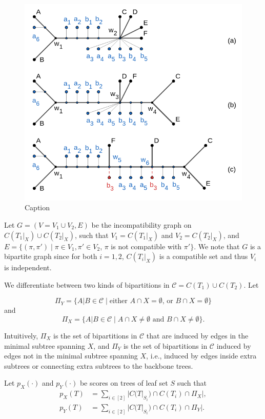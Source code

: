 \documentclass[twocolumn]{bmcart}%
\theoremstyle{mystyle}
\theoremstyle{proofstyle}
\begin{document}
\begin{figure}
    \centering
    \includegraphics[scale = 0.75]{refinement_procedure.png}
    \caption{Caption}
    \label{fig:my_label}
\end{figure}

Let $G = (V=V_1 \cup V_2, E)$ be the incompatibility graph on $C(T_1|_X) \cup C(T_2|_X)$, such that $V_1 = C(T_1|_X)$ and $V_2 = C(T_2|_X)$, and $E = \{(\pi, \pi') \mid \pi \in V_1, \pi' \in V_2$, $\pi$ is not compatible with $\pi'\}$. We note that $G$ is a bipartite graph since for both $i=1,2$, $C(T_i|_X)$ is a compatible set and thus $V_i$ is independent. 

We differentiate between two kinds of bipartitions in $\mathcal{C}=C(T_1) \cup C(T_2)$. Let 

$$\Pi_Y = \{ A|B \in \mathcal{C} \mid \text{either } A\cap X = \emptyset \text{, or } B \cap X = \emptyset\}$$  and 
$$\Pi_X = \{ A|B \in \mathcal{C} \mid A\cap X \neq \emptyset \text{ and } B\cap X \neq \emptyset \}.$$

Intuitively, $\Pi_X$ is the set of bipartitions in  $\mathcal{C}$ that are induced by edges in the minimal subtree spanning $X$, and $\Pi_Y$ is the set of bipartitions in  $\mathcal{C}$ induced by edges not in the minimal subtree spanning $X$, i.e., induced by edges inside extra subtrees or connecting extra subtrees to the backbone trees. 

Let $p_X(\cdot)$ and $p_Y(\cdot)$ be scores on trees of leaf set $S$ such that
\begin{align*}
    p_X(T) &= \sum_{i \in [2]}|C(T|_{S_i}) \cap C(T_i) \cap \Pi_X|,\\
    p_Y(T) &= \sum_{i \in [2]} |C(T|_{S_i}) \cap C(T_i) \cap \Pi_Y|.
\end{align*}
\end{document}

